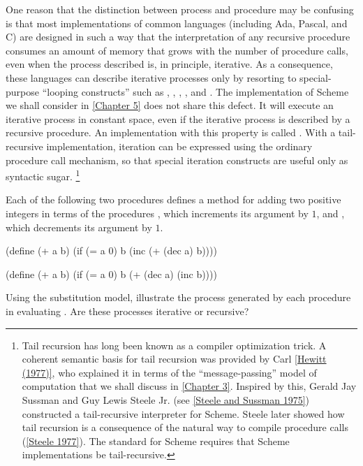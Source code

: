 One reason that the distinction between process and procedure may be confusing is that most implementations of common languages (including Ada, Pascal, and C) are designed in such a way that the interpretation of any recursive procedure consumes an amount of memory that grows with the number of procedure calls, even when the process described is, in principle, iterative.
As a consequence, these languages can describe iterative processes only by resorting to special-purpose “looping constructs” such as , , , , and .
The implementation of Scheme we shall consider in \cref{Chapter 5} does not share this defect.
It will execute an iterative process in constant space, even if the iterative process is described by a recursive procedure.
An implementation with this property is called .
With a tail-recursive implementation, iteration can be expressed using the ordinary procedure call mechanism, so that special iteration constructs are useful only as syntactic sugar.%
\footnote{
	Tail recursion has long been known as a compiler optimization trick.
	A coherent semantic basis for tail recursion was provided by Carl \cref{Hewitt (1977)}, who explained it in terms of the “message-passing” model of computation that we shall discuss in \cref{Chapter 3}.
	Inspired by this, Gerald Jay Sussman and Guy Lewis Steele Jr. (see \cref{Steele and Sussman 1975}) constructed a tail-recursive interpreter for Scheme.
	Steele later showed how tail recursion is a consequence of the natural way to compile procedure calls (\cref{Steele 1977}).
  The  standard for Scheme requires that Scheme implementations be tail-recursive.
}



\begin{exercise}
	\label{Exercise 1.9}
	Each of the following two procedures defines a method for adding two positive integers in terms of the procedures , which increments its argument by \( 1 \), and , which decrements its argument by \( 1 \).
	\begin{scheme}
	  (define (+ a b)
	    (if (= a 0) b (inc (+ (dec a) b))))

	  (define (+ a b)
	    (if (= a 0) b (+ (dec a) (inc b))))
	\end{scheme}
	Using the substitution model, illustrate the process generated by each procedure in evaluating .
	Are these processes iterative or recursive?
\end{exercise}




